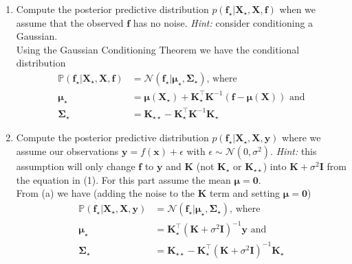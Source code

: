 \documentclass[letter, 12pt]{article}
\begin{document}
\begin{enumerate}
\begin{enumerate}
    \end{enumerate}
    \begin{enumerate}
        \item Compute the posterior predictive distribution
            $p(\mathbf{f}_\star|\mathbf{X}_\star,\mathbf{X},\mathbf{f})$ when
            we assume that the observed $\mathbf{f}$ has no noise. \textit{Hint:}
            consider conditioning a Gaussian.\\[1em]
            Using the Gaussian Conditioning Theorem we have the conditional distribution
            \begin{align*}
                \mathbb{P}(\mathbf{f}_\star | \mathbf{X}_\star, \mathbf{X}, \mathbf{f}) &= \mathcal{N}(\mathbf{f}_\star|\boldsymbol{\mu}_\star,\mathbf{\Sigma}_\star)\text{, where}\\
                \boldsymbol{\mu}_\star &= \boldsymbol{\mu}(\mathbf{X}_\star) + \mathbf{K}_\star^\top\mathbf{K}^{-1}(\mathbf{f} - \boldsymbol{\mu}(\mathbf{X}))\text{ and}\\
                \mathbf{\Sigma}_\star &= \mathbf{K}_{\star\star} - \mathbf{K}_\star^\top \mathbf{K}^{-1}\mathbf{K}_\star
            \end{align*}
            \vfill
        \item Compute the posterior predictive distribution
            $p(\mathbf{f}_\star|\mathbf{X}_\star,\mathbf{X},\mathbf{y})$ where
            we assume our observations $\mathbf{y} = f(\mathbf{x}) + \epsilon$ with
            $\epsilon
            \sim \mathcal{N}(0,\sigma^2)$. \textit{Hint:} this assumption will only
            change $\mathbf{f}$ to $\mathbf{y}$ and $\mathbf{K}$ (not $\mathbf{K}_\star$
            or $\mathbf{K}_{\star\star}$) into $\mathbf{K} + \sigma^2\mathbf{I}$
            from the equation in (1). For this part assume the mean $\boldsymbol{\mu}=
            \mathbf{0}$.\\[1em]
            From (a) we have (adding the noise to the $\mathbf{K}$ term and setting $\boldsymbol{\mu}=\mathbf{0}$)
            \begin{align*}
                \mathbb{P}(\mathbf{f}_\star | \mathbf{X}_\star, \mathbf{X}, \mathbf{y}) &= \mathcal{N}(\mathbf{f}_\star|\boldsymbol{\mu}_\star,\mathbf{\Sigma}_\star)\text{, where}\\
                \boldsymbol{\mu}_\star &= \mathbf{K}_\star^\top\left(\mathbf{K} + \sigma^2 \mathbf{I}\right)^{-1}\mathbf{y}\text{ and}\\
                \mathbf{\Sigma}_\star &= \mathbf{K}_{\star\star} - \mathbf{K}_\star^\top \left(\mathbf{K}+\sigma^2\mathbf{I}\right)^{-1}\mathbf{K}_\star

\end{align*}
\end{enumerate}
\end{enumerate}
\end{document}
